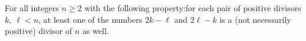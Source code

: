 For all integers $n\ge 2$ with the following property:for each pair of positive divisors $k,~\ell <n$,  at least one of the numbers $2k-\ell$ and $2\ell-k$ is a (not necessarily positive) divisor of $n$ as well.